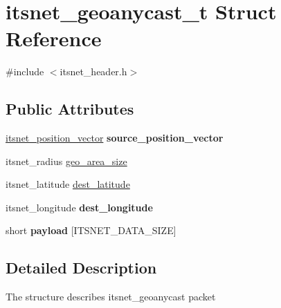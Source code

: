 \hypertarget{structitsnet__geoanycast__t}{\section{itsnet\-\_\-geoanycast\-\_\-t \-Struct \-Reference}
\label{structitsnet__geoanycast__t}
}


{\ttfamily \#include $<$itsnet\-\_\-header.\-h$>$}

\subsection*{\-Public \-Attributes}
\begin{DoxyCompactItemize}
\item 
\hypertarget{structitsnet__geoanycast__t_a3603f64bedb2385f2e6d9ef3bd06ee2a}{\hyperlink{structitsnet__position__vector}{itsnet\-\_\-position\-\_\-vector} {\bfseries source\-\_\-position\-\_\-vector}}\label{structitsnet__geoanycast__t_a3603f64bedb2385f2e6d9ef3bd06ee2a}

\item 
itsnet\-\_\-radius \hyperlink{structitsnet__geoanycast__t_a65c993d970c76b01d436b3a5e797616f}{geo\-\_\-area\-\_\-size}
\item 
itsnet\-\_\-latitude \hyperlink{structitsnet__geoanycast__t_a1d22addaee213ee88bb1e63aadb60cd4}{dest\-\_\-latitude}
\item 
\hypertarget{structitsnet__geoanycast__t_aa7894e498e6d10544cf409bb6ca48edb}{itsnet\-\_\-longitude {\bfseries dest\-\_\-longitude}}\label{structitsnet__geoanycast__t_aa7894e498e6d10544cf409bb6ca48edb}

\item 
\hypertarget{structitsnet__geoanycast__t_a3d0462ccdcb18184a4a060fca74afc6b}{short {\bfseries payload} \mbox{[}\-I\-T\-S\-N\-E\-T\-\_\-\-D\-A\-T\-A\-\_\-\-S\-I\-Z\-E\mbox{]}}\label{structitsnet__geoanycast__t_a3d0462ccdcb18184a4a060fca74afc6b}

\end{DoxyCompactItemize}


\subsection{\-Detailed \-Description}
\-The structure describes itsnet\-\_\-geoanycast packet 

